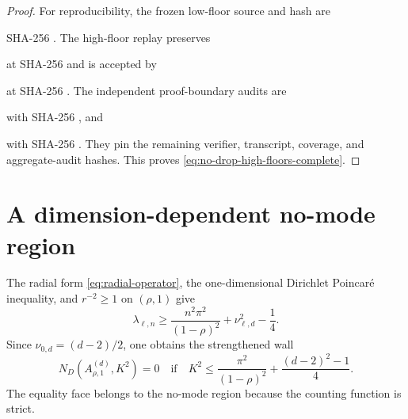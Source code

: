 \documentclass[11pt]{article}
\theoremstyle{remark}
\begin{document}
\begin{proof}
\begingroup\scriptsize
\noindent For reproducibility, the frozen low-floor source and hash are
\par\noindent
{}
\par\noindent
SHA-256
.
The high-floor replay preserves
\par\noindent
{}
\par\noindent
at SHA-256
and is accepted by
\par\noindent
{}
\par\noindent
at SHA-256
.
The independent proof-boundary audits are
\par\noindent
{}
\par\noindent
with SHA-256
,
and
\par\noindent
{}
\par\noindent
with SHA-256
.
They pin the remaining verifier, transcript, coverage, and aggregate-audit
hashes.
\endgroup
This proves \eqref{eq:no-drop-high-floors-complete}.
\end{proof}

\section{A dimension-dependent no-mode region}

The radial form \eqref{eq:radial-operator}, the one-dimensional Dirichlet
Poincar\'e inequality, and $r^{-2}\geq1$ on $(\rho,1)$ give
\[
 \lambda_{\ell,n}\geq
 \frac{n^2\pi^2}{(1-\rho)^2}+\nu_{\ell,d}^2-\frac14.
\]
Since $\nu_{0,d}=(d-2)/2$, one obtains the strengthened wall
\begin{equation}
 N_D(A_{\rho,1}^{(d)},K^2)=0
 \quad\text{if}\quad
 K^2\leq\frac{\pi^2}{(1-\rho)^2}
 +\frac{(d-2)^2-1}{4}.
 \label{eq:no-mode}
\end{equation}
The equality face belongs to the no-mode region because the counting
function is strict.
\end{document}
